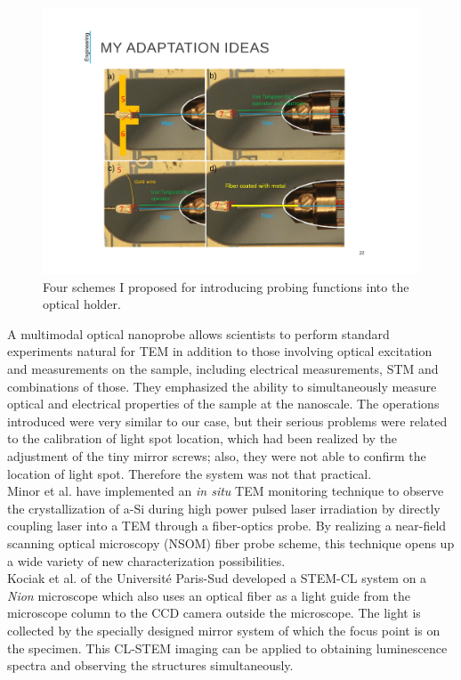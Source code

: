 \begin{figure}  
\centering
\includegraphics[height=0.95\textwidth, angle=-90]{figures/figure2_4ways}
\caption[Proposed four ways of holder adaption]{Four schemes I proposed for introducing probing functions into the optical holder.
\label{fig:4ways}}
\end{figure}

A multimodal optical nanoprobe allows scientists to perform standard experiments natural for TEM in addition to those involving optical excitation and measurements on the sample, including electrical measurements, STM and combinations of those. They emphasized the ability to simultaneously measure optical and electrical properties of the sample at the nanoscale.\cite{Zhu2012Multimodal}  The operations introduced were very similar to our case, but their serious problems were related to the calibration of light spot location, which had been realized by the adjustment of the tiny mirror screws; also, they were not able to confirm the location of light spot. Therefore the system was not that practical. \\
Minor et al. have implemented an {\it in situ} TEM monitoring technique to observe the crystallization of a-Si during high power pulsed laser irradiation by directly coupling laser into a TEM through a fiber-optics probe. By realizing a near-field scanning optical microscopy (NSOM) fiber probe scheme, this technique opens up a wide variety of new characterization possibilities.\cite{Xiang2012}\\
Kociak et al. of the Université Paris-Sud \cite{Zagonel2011} developed a STEM-CL system on a \textit{Nion} microscope which also uses an optical fiber as a light guide from the microscope column to the CCD camera outside the microscope. The light is collected by the specially designed mirror system of which the focus point is on the specimen. This CL-STEM imaging can be applied to obtaining luminescence spectra and observing the structures simultaneously.\cite{Nagarajan2016Simultaneous}

